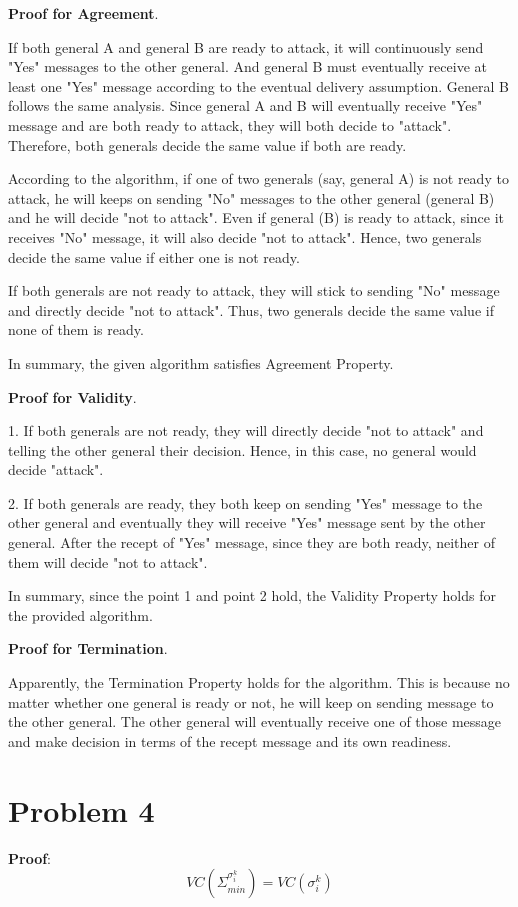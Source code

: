 \documentclass[11pt,a4paper]{article}
\begin{document}
\textbf{Proof for Agreement}. 

If both general A and general B are ready to attack, it will continuously send
"Yes" messages to the other general. And general B must eventually receive at
least one "Yes" message according to the eventual delivery assumption. General B
follows the same analysis. Since general A and B will eventually receive "Yes"
message and are both ready to attack, they will both decide to "attack".
Therefore, both generals decide the same value if both are ready.

According to the algorithm, if one of two generals (say, general A) is not
ready to attack, he will keeps on sending "No" messages to the other general
(general B) and he will decide "not to attack". Even if general (B) is ready
to attack, since it receives "No" message, it will also decide "not to
attack". Hence, two generals decide the same value if either one is not ready.

If both generals are not ready to attack, they will stick to sending "No"
message and directly decide "not to attack". Thus, two generals decide the
same value if none of them is ready.

In summary, the given algorithm satisfies Agreement Property.

\textbf{Proof for Validity}. 

1. If both generals are not ready, they will directly decide "not to attack"
and telling the other general their decision. Hence, in this case, no general
would decide "attack".

2. If both generals are ready, they both keep on sending "Yes" message to the
other general and eventually they will receive "Yes" message sent by the other
general. After the recept of "Yes" message, since they are both ready, neither
of them will decide "not to attack".

In summary, since the point 1 and point 2 hold, the Validity Property
holds for the provided algorithm.

\textbf{Proof for Termination}. 

Apparently, the Termination Property holds for the algorithm. This is because
no matter whether one general is ready or not, he will keep on sending message
to the other general. The other general will eventually receive one of those
message and make decision in terms of the recept message and its own readiness.

\newpage
\section{Problem 4}
\textbf{Proof}:
$$ VC (\Sigma_{min}^{\sigma_i^k}) = VC (\sigma_i^k)$$
\end{document}
